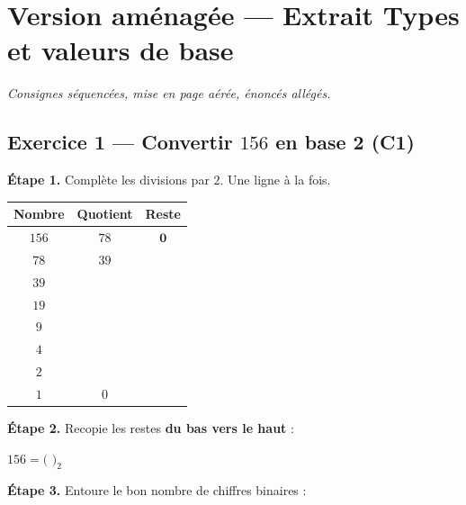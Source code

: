\section*{Version aménagée --- Extrait Types et valeurs de base}
\textit{Consignes séquencées, mise en page aérée, énoncés allégés.}

\bigskip

\subsection*{Exercice 1 --- Convertir $156$ en base 2 (C1)}

\textbf{Étape 1.} Complète les divisions par $2$. Une ligne à la fois.

\bigskip

\begin{center}
\begin{tabular}{|c|c|c|}
\hline
\textbf{Nombre} & \textbf{Quotient} & \textbf{Reste} \\
\hline
$156$ & $78$ & $\mathbf{0}$ \\
\hline
$78$ & $39$ & \dotfill \\
\hline
$39$ & \dotfill & \dotfill \\
\hline
$19$ & \dotfill & \dotfill \\
\hline
$9$ & \dotfill & \dotfill \\
\hline
$4$ & \dotfill & \dotfill \\
\hline
$2$ & \dotfill & \dotfill \\
\hline
$1$ & $0$ & \dotfill \\
\hline
\end{tabular}
\end{center}

\bigskip

\textbf{Étape 2.} Recopie les restes \textbf{du bas vers le haut} :

\medskip
$156 = ($\,\dotfill\,$)_2$

\bigskip

\textbf{Étape 3.} Entoure le bon nombre de chiffres binaires :


